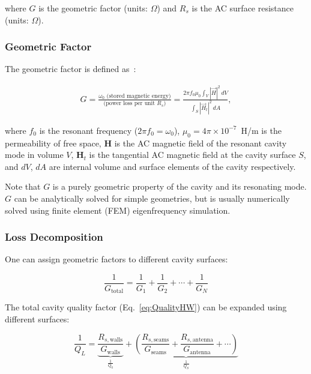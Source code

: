     \noindent where $G$ is the geometric factor (units: $\Omega$) and $R_s$ is the AC surface resistance (units: $\Omega$). 

    \subsubsection{Geometric Factor}
    
    The geometric factor is defined as~\cite{padamseeRFSuperconductivity2009}:
    
    \begin{align}
       G = \frac{\omega_0 \text{~(stored magnetic energy)}}{\text{(power loss per unit } R_s \text{)}} = \frac{2\pi f_0 \mu_0 \int_V |\vec{H}|^2 \, dV}{\int_S |\vec{H}_t|^2 \, dA}  \label{eq:geometric_factor} ,
    \end{align}
   
    \noindent where $f_0$ is the resonant frequency ($2\pi f_0 = \omega_0$), $\mu_0 = 4\pi \times 10^{-7}$~H/m is the permeability of free space, $\textbf{H}$ is the AC magnetic field of the resonant cavity mode in volume $V$, $\textbf{H}_t$ is the tangential AC magnetic field at the cavity surface $S$, and $dV$, $dA$ are internal volume and surface elements of the cavity respectively. 
    
    Note that $G$ is a purely geometric property of the cavity and its resonating mode. $G$ can be analytically solved for simple geometries, but is usually numerically solved using finite element (FEM) eigenfrequency simulation. 

    \subsubsection{Loss Decomposition}

    One can assign geometric factors to different cavity surfaces:

    \begin{equation}
        \frac{1}{G_{\text{total}}} = \frac{1}{G_1} + \frac{1}{G_2} + \cdots + \frac{1}{G_N}
        \label{eq:G_parallel}
    \end{equation}
        
    The total cavity quality factor (Eq.~\ref{eq:QualityHW}) can be expanded using different surfaces:

    \begin{equation}
        \frac{1}{Q_L} = \underbrace{\frac{R_{s,\text{walls}}}{G_{\text{walls}}}}_{\frac{1}{Q_0}} + \underbrace{\left(\frac{R_{s,\text{seams}}}{G_{\text{seams}}} + \frac{R_{s,\text{antenna}}}{G_{\text{antenna}}} + \cdots \right)}_{\frac{1}{Q_S}}
        \label{eq:Q0_decomposed_grouped}
    \end{equation}


